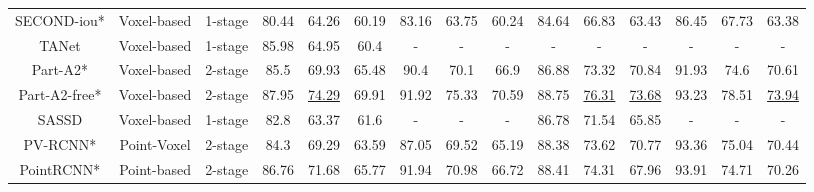 \begin{table}
{\begin{tabular}{c|c|c|ccc|ccc|ccc|ccc}
		SECOND-iou* \cite{yan2018second}             & Voxel-based                & 1-stage               & 80.44                 & 64.26          & 60.19          & 83.16                  & 63.75          & 60.24          & 84.64          & 66.83          & 63.43          & 86.45          & 67.73                  & 63.38          \\
		TANet \cite{liu2020tanet}                   & Voxel-based                & 1-stage               & 85.98                 & 64.95          & 60.4           & -                      & -              & -              & -              & -              & -              & -              & -                      & -              \\
		Part-A2* \cite{shi2020points}                 & Voxel-based                & 2-stage               & 85.5                  & 69.93          & 65.48          & 90.4                   & 70.1           & 66.9           & 86.88          & 73.32          & 70.84          & 91.93          & 74.6                   & 70.61          \\
		Part-A2-free* \cite{shi2020points}           & Voxel-based                & 2-stage               & 87.95                 & \uline{74.29}  & 69.91          & 91.92                  & 75.33          & 70.59          & 88.75          & \uline{76.31}  & \uline{73.68}  & 93.23          & 78.51                  & \uline{73.94}  \\
		SASSD \cite{he2020structure}                   & Voxel-based                & 1-stage               & 82.8                  & 63.37          & 61.6           & -                      & -              & -              & 86.78          & 71.54          & 65.85          & -              & -                      & -              \\ 
		\hline
		PV-RCNN* \cite{shi2020pv}                & Point-Voxel                & 2-stage               & 84.3                  & 69.29          & 63.59          & 87.05                  & 69.52          & 65.19          & 88.38          & 73.62          & 70.77          & 93.36          & 75.04                  & 70.44          \\ 
		\hline
		PointRCNN* \cite{shi2019pointrcnn}              & Point-based                & 2-stage               & 86.76                 & 71.68          & 65.77          & 91.94                  & 70.98          & 66.72          & 88.41          & 74.31          & 67.96          & 93.91          & 74.71                  & 70.26          \\

\end{tabular}}
\end{table}
